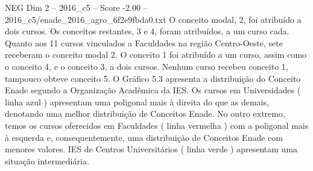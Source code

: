 \begin{textsample}{NEG Dim 2 – 2016\_c5 – Score -2.00 – 2016\_c5/enade\_2016\_agro\_6f2e9fbda0.txt}
O conceito modal, 2, foi atribuído a dois cursos.
Os conceitos restantes, 3 e 4, foram atribuídos, a um curso cada.
Quanto aos 11 cursos vinculados a Faculdades na região Centro-Oeste, sete receberam o conceito modal 2.
O conceito 1 foi atribuído a um curso, assim como o conceito 4, e o conceito 3, a dois cursos.
Nenhum curso recebeu conceito 1, tampouco obteve conceito 5.
O Gráfico 5.3 apresenta a distribuição do Conceito Enade segundo a Organização Acadêmica da IES.
Os cursos em Universidades ( linha azul ) apresentam uma poligonal mais à direita do que as demais, denotando uma melhor distribuição de Conceitos Enade.
No outro extremo, temos os cursos oferecidos em Faculdades ( linha vermelha ) com a poligonal mais à esquerda e, consequentemente, uma distribuição de Conceitos Enade com menores valores.
IES de Centros Universitários ( linha verde ) apresentam uma situação intermediária.

\end{textsample}
